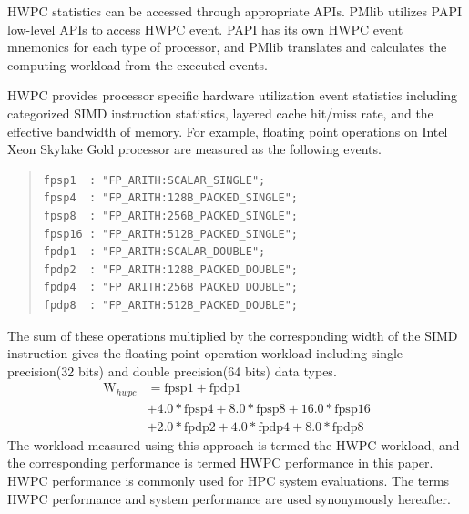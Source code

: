 \documentclass[conference]{IEEEtran}
\begin{document}
HWPC statistics can be accessed through appropriate APIs.
PMlib utilizes PAPI low-level APIs to access HWPC event.
PAPI has its own HWPC event mnemonics for each type of processor, and PMlib
translates and calculates the computing workload from the executed events.

HWPC provides processor specific hardware utilization event statistics
including categorized SIMD instruction statistics, layered cache
hit/miss rate, and the effective bandwidth of memory.
For example, floating point operations on
Intel Xeon Skylake Gold processor %
are measured as the following events.
\vspace{1mm}
\begin{quote}
\begin{small}
\begin{verbatim}
fpsp1  : "FP_ARITH:SCALAR_SINGLE";
fpsp4  : "FP_ARITH:128B_PACKED_SINGLE";
fpsp8  : "FP_ARITH:256B_PACKED_SINGLE";
fpsp16 : "FP_ARITH:512B_PACKED_SINGLE";
fpdp1  : "FP_ARITH:SCALAR_DOUBLE";
fpdp2  : "FP_ARITH:128B_PACKED_DOUBLE";
fpdp4  : "FP_ARITH:256B_PACKED_DOUBLE";
fpdp8  : "FP_ARITH:512B_PACKED_DOUBLE";
\end{verbatim}
\end{small}
\end{quote}
\vspace{1mm}
The sum of these operations multiplied by the corresponding width
of the SIMD instruction gives the floating point operation workload
including single precision(32 bits) and double precision(64 bits) data types.
\begin{align}
	\mathrm{W}_{hwpc} & = \mathrm{fpsp1} + \mathrm{fpdp1} \nonumber \\
			& + 4.0*\mathrm{fpsp4} + 8.0*\mathrm{fpsp8} + 16.0*\mathrm{fpsp16} \nonumber \\
			& + 2.0*\mathrm{fpdp2} + 4.0*\mathrm{fpdp4} + 8.0*\mathrm{fpdp8}
\end{align}
%
The workload measured using this approach is termed the HWPC workload,
and the corresponding performance is termed HWPC performance in this paper.
HWPC performance is commonly used for HPC system evaluations.
The terms HWPC performance and system performance are used synonymously hereafter.
\end{document}
